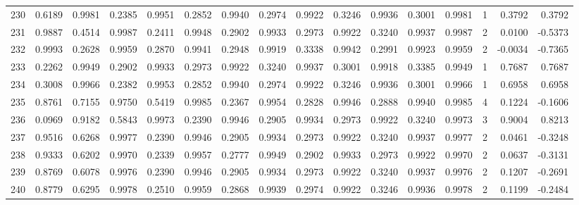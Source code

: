 \begin{tabular}{lrrrrrrrrrrrrrrr}
230 &      0.6189 &  0.9981 &  0.2385 &  0.9951 &  0.2852 &  0.9940 &  0.2974 &  0.9922 &  0.3246 &  0.9936 &   0.3001 &     0.9981 &      1 &                    0.3792 &                     0.3792 \\
231 &      0.9887 &  0.4514 &  0.9987 &  0.2411 &  0.9948 &  0.2902 &  0.9933 &  0.2973 &  0.9922 &  0.3240 &   0.9937 &     0.9987 &      2 &                    0.0100 &                    -0.5373 \\
232 &      0.9993 &  0.2628 &  0.9959 &  0.2870 &  0.9941 &  0.2948 &  0.9919 &  0.3338 &  0.9942 &  0.2991 &   0.9923 &     0.9959 &      2 &                   -0.0034 &                    -0.7365 \\
233 &      0.2262 &  0.9949 &  0.2902 &  0.9933 &  0.2973 &  0.9922 &  0.3240 &  0.9937 &  0.3001 &  0.9918 &   0.3385 &     0.9949 &      1 &                    0.7687 &                     0.7687 \\
234 &      0.3008 &  0.9966 &  0.2382 &  0.9953 &  0.2852 &  0.9940 &  0.2974 &  0.9922 &  0.3246 &  0.9936 &   0.3001 &     0.9966 &      1 &                    0.6958 &                     0.6958 \\
235 &      0.8761 &  0.7155 &  0.9750 &  0.5419 &  0.9985 &  0.2367 &  0.9954 &  0.2828 &  0.9946 &  0.2888 &   0.9940 &     0.9985 &      4 &                    0.1224 &                    -0.1606 \\
236 &      0.0969 &  0.9182 &  0.5843 &  0.9973 &  0.2390 &  0.9946 &  0.2905 &  0.9934 &  0.2973 &  0.9922 &   0.3240 &     0.9973 &      3 &                    0.9004 &                     0.8213 \\
237 &      0.9516 &  0.6268 &  0.9977 &  0.2390 &  0.9946 &  0.2905 &  0.9934 &  0.2973 &  0.9922 &  0.3240 &   0.9937 &     0.9977 &      2 &                    0.0461 &                    -0.3248 \\
238 &      0.9333 &  0.6202 &  0.9970 &  0.2339 &  0.9957 &  0.2777 &  0.9949 &  0.2902 &  0.9933 &  0.2973 &   0.9922 &     0.9970 &      2 &                    0.0637 &                    -0.3131 \\
239 &      0.8769 &  0.6078 &  0.9976 &  0.2390 &  0.9946 &  0.2905 &  0.9934 &  0.2973 &  0.9922 &  0.3240 &   0.9937 &     0.9976 &      2 &                    0.1207 &                    -0.2691 \\
240 &      0.8779 &  0.6295 &  0.9978 &  0.2510 &  0.9959 &  0.2868 &  0.9939 &  0.2974 &  0.9922 &  0.3246 &   0.9936 &     0.9978 &      2 &                    0.1199 &                    -0.2484 \\

\end{tabular}
